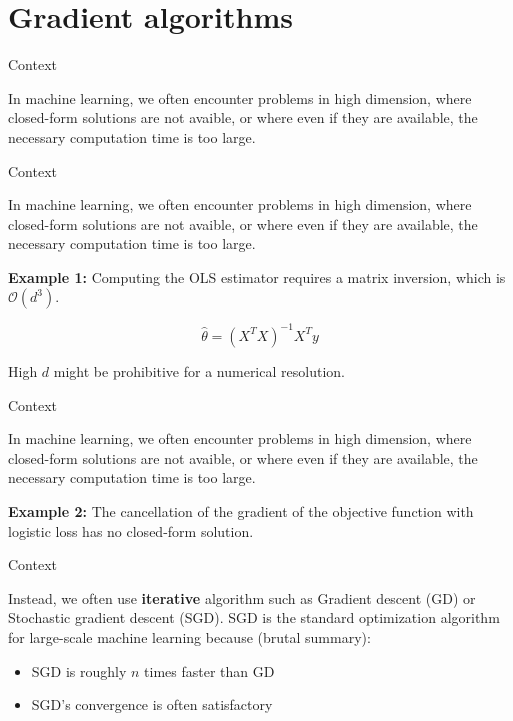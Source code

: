 \documentclass[usenames,dvipsnames]{beamer}
\begin{document}
\section{Gradient algorithms}
\label{sec:gradients}

\begin{frame}{Context}

    In machine learning, we often encounter problems in high dimension, where closed-form solutions are not avaible, or where even if they are available, the necessary computation time is too large.
    
\end{frame}

\begin{frame}{Context}

    In machine learning, we often encounter problems in high dimension, where closed-form solutions are not avaible, or where even if they are available, the necessary computation time is too large.
    
    \textbf{{Example 1:}} Computing the OLS estimator requires a matrix inversion, which is $ \mathcal{O} (d^3)$.

    \begin{equation}
	\label{def:ols}
	\hat{ \theta}= (X^TX)^{-1}X^Ty
    \end{equation}

    High $d$ might be prohibitive for a numerical resolution.
\end{frame}

\begin{frame}{Context}

    In machine learning, we often encounter problems in high dimension, where closed-form solutions are not avaible, or where even if they are available, the necessary computation time is too large.
    
    \textbf{{Example 2:}} The cancellation of the gradient of the objective function with logistic loss has no closed-form solution.

\end{frame}

\begin{frame}{Context}


    Instead, we often use \textbf{{iterative}} algorithm such as Gradient descent (GD) or Stochastic gradient descent (SGD). SGD is the standard optimization algorithm for large-scale machine learning because (brutal summary):
    \begin{itemize}
    	\item SGD is roughly $n$ times faster than GD
	\item SGD's convergence is often satisfactory
    \end{itemize}
    
\end{frame}
\end{document}
